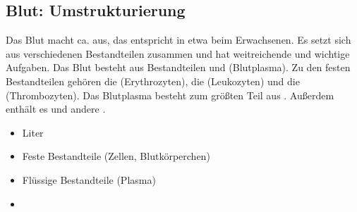 \documentclass[
ngerman,
paper=a4,
asymmetric,
fontsize=10pt,
draft=false,
numbers=noenddot,
bibtotocnumbered,
footnotes=multiple,
]{scrreprt}
\begin{document}
\subsection{Blut: Umstrukturierung}



\TextSlide{\TxBeschreibung}
{%
Das Blut macht ca. 
aus, das entspricht in etwa  beim
Erwachsenen. Es setzt sich aus verschiedenen Bestandteilen
zusammen und hat weitreichende und wichtige Aufgaben. 
Das Blut besteht aus
 Bestandteilen und 
(Blutplasma).
Zu
den festen Bestandteilen gehören die  (Erythrozyten), die  (Leukozyten) und die 
(Thrombozyten).
Das Blutplasma besteht zum größten Teil aus .
Außerdem enthält es  und andere .
}{
\begin{itemize}
  \item {} Liter
  \item Feste Bestandteile (Zellen, Blutkörperchen)
  \item Flüssige Bestandteile (Plasma)
  \item {}
\end{itemize}
}{}{}{}
\end{document}
